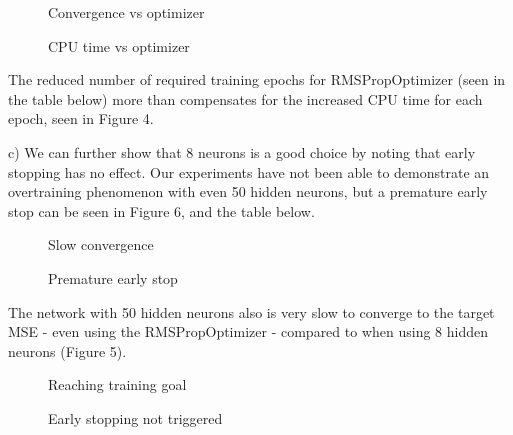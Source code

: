 \documentclass[11pt]{article}
\begin{document}
\begin{enumerate}
\begin{figure}[h!]
    \centering
    \begin{minipage}{0.45\textwidth}
        \centering
        \caption{Convergence vs optimizer}
    \end{minipage}\hfill
    \begin{minipage}{0.45\textwidth}
        \centering
        \caption{CPU time vs optimizer}
    \end{minipage}
\end{figure}

The reduced number of required training epochs for RMSPropOptimizer (seen in the table below) more than compensates for the increased CPU time for each epoch, seen in Figure 4.\newline
%


c) We can further show that 8 neurons is a good choice by noting that early stopping has no effect. Our experiments have not been able to demonstrate an overtraining phenomenon with even 50 hidden neurons, but a premature early stop can be seen in Figure 6, and the table below.\newline
%

\begin{figure}[h!]
    \centering
    \begin{minipage}{0.45\textwidth}
        \centering
        \caption{Slow convergence}
    \end{minipage}\hfill
    \begin{minipage}{0.45\textwidth}
        \centering
        \caption{Premature early stop}
    \end{minipage}
\end{figure}

The network with 50 hidden neurons also is very slow to converge to the target MSE - even using the RMSPropOptimizer - compared to when using 8 hidden neurons (Figure 5).\newline

\begin{figure}[h!]
    \centering
    \begin{minipage}{0.45\textwidth}
        \centering
        \caption{Reaching training goal}
    \end{minipage}\hfill
    \begin{minipage}{0.45\textwidth}
        \centering
        \caption{Early stopping not triggered}
    \end{minipage}
\end{figure}


\end{enumerate}
\end{document}
